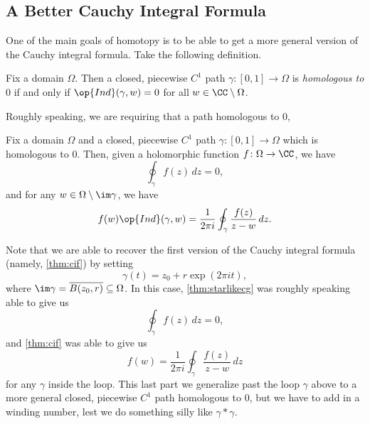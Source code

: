 \subsection{A Better Cauchy Integral Formula}
One of the main goals of homotopy is to be able to get a more general version of the Cauchy integral formula. Take the following definition.
\begin{definition}
	Fix a domain $\Omega$. Then a closed, piecewise $C^1$ path $\gamma\colon [0,1]\to\Omega$ is \textit{homologous to $0$} if and only if $\op{Ind}(\gamma,w)=0$ for all $w\in\CC\setminus\Omega$.
\end{definition}
Roughly speaking, we are requiring that a path homologous to $0$, 
\begin{theorem} \label{thm:cif2}
	Fix a domain $\Omega$ and a closed, piecewise $C^1$ path $\gamma\colon [0,1]\to\Omega$ which is homologous to $0$. Then, given a holomorphic function $f\colon \Omega\to\CC$, we have
	\[\oint_\gamma f(z)\,dz=0,\]
	and for any $w\in\Omega\setminus\im\gamma$, we have
	\[f(w)\op{Ind}(\gamma,w)=\frac1{2\pi i}\oint_\gamma\frac{f(z)}{z-w}\,dz.\]
\end{theorem}
Note that we are able to recover the first version of the Cauchy integral formula (namely, \autoref{thm:cif}) by setting
\[\gamma(t)=z_0+r\exp(2\pi it),\]
where $\im\gamma=\overline{B(z_0,r)}\subseteq\Omega$. In this case, \autoref{thm:starlikecg} was roughly speaking able to give us
\[\oint_\gamma f(z)\,dz=0,\]
and \autoref{thm:cif} was able to give us
\[f(w)=\frac1{2\pi i}\oint_\gamma\frac{f(z)}{z-w}\,dz\]
for any $\gamma$ inside the loop. This last part we generalize past the loop $\gamma$ above to a more general closed, piecewise $C^1$ path homologous to $0$, but we have to add in a winding number, lest we do something silly like $\gamma*\gamma$.

